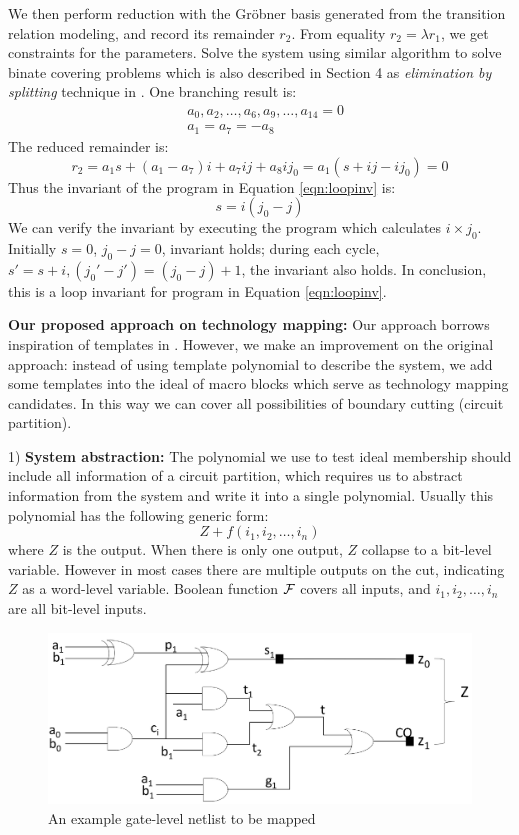 We then perform reduction with the Gr\"obner basis generated from the transition relation modeling, 
and record its remainder $r_2$.
From equality $r_2 = \lambda r_1$, we get constraints for the parameters. Solve the system using 
similar algorithm to solve binate covering problems
which is also described in Section 4 as \emph{elimination by splitting} technique in \cite{sankaranarayanan2004non}. 
One branching result is:
\begin{align*}
&a_0,a_2,\dots, a_6, a_9,\dots,a_{14}=  0\\ 
&a_1=a_7=-a_8
\end{align*}
The reduced remainder is: 
$$r_2 = a_1s +(a_1-a_7)i+a_7ij+a_8ij_0 = a_1(s+ij-ij_0) = 0$$
Thus the invariant of the program in Equation \ref{eqn:loopinv} is:
$$s = i(j_0- j)$$
We can verify the invariant by executing the program which calculates $i\times j_0$. 
Initially $s=0$, $j_0-j=0$, invariant holds;
during each cycle, $s'=s+i, (j_0'-j') = (j_0-j)+1$, the invariant also holds. In conclusion, this is a
loop invariant for program in Equation \ref{eqn:loopinv}.

{\bf Our proposed approach on technology mapping:}
Our approach borrows inspiration of templates in \cite{sankaranarayanan2004non}. However, we make an improvement
on the original approach:
instead of using template polynomial to describe the system, we add some templates into the ideal
of macro blocks which serve as technology mapping candidates. In this way we can cover all possibilities
of boundary cutting (circuit partition).

1) {\bf System abstraction:}
The polynomial we use to test ideal membership should include all information of a circuit partition,
which requires us to abstract information from the system and write it into a single polynomial.
Usually this polynomial has the following generic form:
$$Z + f(i_1,i_2,\dots,i_n)$$
where $Z$ is the output. When there is only one output, $Z$ collapse to a bit-level variable. However in most
cases there are multiple outputs on the cut, indicating $Z$ as a word-level variable. Boolean function ${\mathcal{F}}$ covers
all inputs, and $i_1,i_2,\dots,i_n$ are all bit-level inputs.

\begin{figure}[h]
	\begin{center}
	\includegraphics[width=\textwidth]{newfig/tobemapped.pdf}
	\end{center}
	\caption{An example gate-level netlist to be mapped}
	\label{fig:tobemapped}
\end{figure}

